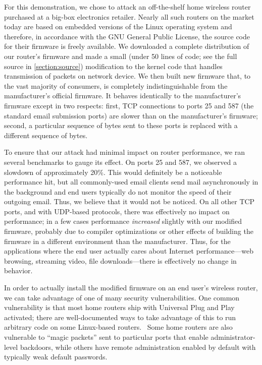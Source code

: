 \documentclass{article}
\begin{document}
For this demonstration, we chose to attack an off-the-shelf home
wireless router purchased at a big-box electronics retailer. Nearly
all such routers on the market today are based on embedded versions of
the Linux operating system and therefore, in accordance with the GNU
General Public License, the source code for their firmware is freely
available. We downloaded a complete distribution of our router's
firmware and made a small (under 50 lines of code; see the full source
in \autoref{section:source}) modification to the kernel code that
handles transmission of packets on network device. We then built new
firmware that, to the vast majority of consumers, is completely
indistinguishable from the manufacturer's official firmware. It
behaves identically to the manufacturer's firmware except in two
respects: first, TCP connections to ports 25 and 587 (the standard
email submission ports) are slower than on the manufacturer's
firmware; second, a particular sequence of bytes sent to these ports
is replaced with a different sequence of bytes.

To ensure that our attack had minimal impact on router performance, we
ran several benchmarks to gauge its effect. On ports 25 and 587, we
observed a slowdown of approximately 20\%. This would definitely be a
noticeable performance hit, but all commonly-used email clients send
mail asynchronously in the background and end users typically do not
monitor the speed of their outgoing email. Thus, we believe that it
would not be noticed. On all other TCP ports, and with UDP-based
protocols, there was effectively no impact on performance; in a few
cases performance \emph{increased} slightly with our modified
firmware, probably due to compiler optimizations or other effects of
building the firmware in a different environment than the
manufacturer. Thus, for the applications where the end user actually
cares about Internet performance---web browsing, streaming video, file
downloads---there is effectively no change in behavior.

In order to actually install the modified firmware on an end user's
wireless router, we can take advantage of one of many security
vulnerabilities. One common vulnerability is that most home routers
ship with Universal Plug and Play activated; there are well-documented
ways to take advantage of this to run arbitrary code on some
Linux-based routers.~\cite{UPnP} Some home routers are also vulnerable
to ``magic packets'' sent to particular ports that enable
administrator-level backdoors, while others have remote administration
enabled by default with typically weak default passwords.
\end{document}
